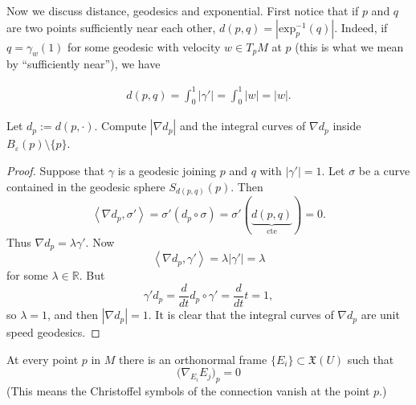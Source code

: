 \medskip\noindent
Now we discuss distance, geodesics and
exponential.
First notice that if $p$ and $q$ are two
points sufficiently near each other,
$d(p,q)=|\text{exp}^{-1}_p(q)|$.
Indeed, if $q=\gamma_w(1)$ for some geodesic
with
velocity $w \in T_pM$ at $p$ (this is what
we mean by ``sufficiently near''),
we have

$$
\begin{aligned}
d(p,q)=\int_0^1|\gamma'|=\int_0^1|w|=|w|.
\end{aligned}
$$

\begin{exercise}
\label{exercise-diffe-dista-funct}
Let $d_p:=d(p,\cdot)$. Compute $|\nabla d_p|$
and the integral
curves of $\nabla d_p$ inside
$B_\varepsilon(p)\setminus\{p\}$.
\end{exercise}

\begin{proof}
Suppose that $\gamma$ is a geodesic joining
$p$ and $q$
with $|\gamma'|=1$.
Let $\sigma$ be a curve contained in the
geodesic sphere $S_{d(p,q)}(p)$.
Then
$$
\left\langle{}\nabla d_p,\sigma'\right\rangle{}
=\sigma'(d_p\circ \sigma)
=\sigma'(\underbrace{d(p,q)}_{\text{cte}})=0.
$$
Thus $\nabla d_p=\lambda\gamma'$.
Now
$$
\left\langle{}\nabla d_p,\gamma'\right\rangle{}
=\lambda |\gamma'|=\lambda
$$
for some $\lambda \in \mathbb{R}$.
But
$$
\gamma'd_p=\frac{d}{dt}d_p \circ \gamma'
=\frac{d}{dt}t=1,
$$
so $\lambda=1$, and then $|\nabla d_p|=1$.
It is clear that the integral curves of
$\nabla d_p$
are unit speed geodesics.
\end{proof}

\begin{lemma}
\label{lemma-geodesic-coordinates}
At every point $p$ in $M$ there is an
orthonormal frame
$\{E_i\} \subset \mathfrak{X}(U)$ such that
\begin{equation}
\label{equation-norma-coord-vanis-chris}
\Big(\nabla_{E_i}E_j\Big)_p=0
\end{equation}
(This means the Christoffel symbols of the
connection vanish at the point $p$.)
\end{lemma}

